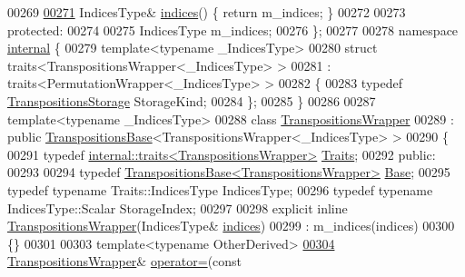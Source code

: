 \begin{DoxyCode}
00269     
\hyperlink{class_eigen_1_1_map_3_01_transpositions_3_01_size_at_compile_time_00_01_max_size_at_compile_timecc993082d7c0ba51ca94b27e97da8dd3_a1f8c96b93122a0e3237a05c11e8812c5}{00271}     IndicesType& \hyperlink{class_eigen_1_1_map_3_01_transpositions_3_01_size_at_compile_time_00_01_max_size_at_compile_timecc993082d7c0ba51ca94b27e97da8dd3_a1f8c96b93122a0e3237a05c11e8812c5}{indices}() \{ \textcolor{keywordflow}{return} m\_indices; \}
00272 
00273   \textcolor{keyword}{protected}:
00274 
00275     IndicesType m\_indices;
00276 \};
00277 
00278 \textcolor{keyword}{namespace }\hyperlink{namespaceinternal}{internal} \{
00279 \textcolor{keyword}{template}<\textcolor{keyword}{typename} \_IndicesType>
00280 \textcolor{keyword}{struct }traits<TranspositionsWrapper<\_IndicesType> >
00281  : traits<PermutationWrapper<\_IndicesType> >
00282 \{
00283   \textcolor{keyword}{typedef} \hyperlink{struct_eigen_1_1_transpositions_storage}{TranspositionsStorage} StorageKind;
00284 \};
00285 \}
00286 
00287 \textcolor{keyword}{template}<\textcolor{keyword}{typename} \_IndicesType>
00288 \textcolor{keyword}{class }\hyperlink{class_eigen_1_1_transpositions_wrapper}{TranspositionsWrapper}
00289  : \textcolor{keyword}{public} \hyperlink{class_eigen_1_1_transpositions_base}{TranspositionsBase}<TranspositionsWrapper<\_IndicesType> >
00290 \{
00291     \textcolor{keyword}{typedef} \hyperlink{struct_eigen_1_1internal_1_1traits}{internal::traits<TranspositionsWrapper>} 
      \hyperlink{struct_eigen_1_1internal_1_1traits}{Traits};
00292   \textcolor{keyword}{public}:
00293 
00294     \textcolor{keyword}{typedef} \hyperlink{class_eigen_1_1_transpositions_base}{TranspositionsBase<TranspositionsWrapper>} 
      \hyperlink{class_eigen_1_1_transpositions_base}{Base};
00295     \textcolor{keyword}{typedef} \textcolor{keyword}{typename} Traits::IndicesType IndicesType;
00296     \textcolor{keyword}{typedef} \textcolor{keyword}{typename} IndicesType::Scalar StorageIndex;
00297 
00298     \textcolor{keyword}{explicit} \textcolor{keyword}{inline} \hyperlink{class_eigen_1_1_transpositions_wrapper}{TranspositionsWrapper}(IndicesType& 
      \hyperlink{class_eigen_1_1_transpositions_base_a90acc796341b4627882705d1099e593d}{indices})
00299       : m\_indices(indices)
00300     \{\}
00301 
00303     \textcolor{keyword}{template}<\textcolor{keyword}{typename} OtherDerived>
\hyperlink{class_eigen_1_1_transpositions_wrapper_ac4e1956279759cbda2c9f2784197cfe9}{00304}     \hyperlink{class_eigen_1_1_transpositions_wrapper}{TranspositionsWrapper}& \hyperlink{class_eigen_1_1_transpositions_wrapper_ac4e1956279759cbda2c9f2784197cfe9}{operator=}(\textcolor{keyword}{const} 

\end{DoxyCode}
